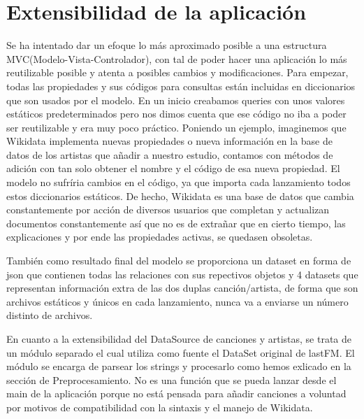 \section{Extensibilidad de la aplicación}

Se ha intentado dar un efoque lo más aproximado posible a una estructura MVC(Modelo-Vista-Controlador), con tal de poder hacer una aplicación lo más reutilizable posible y atenta a posibles cambios y modificaciones.
Para empezar, todas las propiedades y sus códigos para consultas están incluidas en diccionarios que son usados por el modelo. En un inicio creabamos queries con unos valores estáticos predeterminados pero nos dimos cuenta que ese código no iba a poder ser reutilizable y era muy poco práctico. Poniendo un ejemplo, imaginemos que Wikidata implementa nuevas propiedades o nueva información en la base de datos de los artistas que añadir a nuestro estudio, contamos con métodos de adición con tan solo obtener el nombre y el código de esa nueva propiedad. El modelo no sufríria cambios en el código, ya que importa cada lanzamiento todos estos diccionarios estáticos. De hecho, Wikidata es una base de datos que cambia constantemente por acción de diversos usuarios que completan y actualizan documentos constantemente así que no es de extrañar que en cierto tiempo, las explicaciones y por ende las propiedades activas, se quedasen obsoletas.

También como resultado final del modelo se proporciona un dataset en forma de json que contienen todas las relaciones con sus repectivos objetos y 4 datasets que representan información extra de las dos duplas canción/artista, de forma que son archivos estáticos y únicos en cada lanzamiento, nunca va a enviarse un número distinto de archivos.

En cuanto a la extensibilidad del DataSource de canciones y artistas, se trata de un módulo separado el cual utiliza como fuente el DataSet original de lastFM. El módulo se encarga de parsear los strings y procesarlo como hemos exlicado en la sección de Preprocesamiento. No es una función que se pueda lanzar desde el main de la aplicación porque no está pensada para añadir canciones a voluntad por motivos de compatibilidad con la sintaxis y el manejo de Wikidata.


